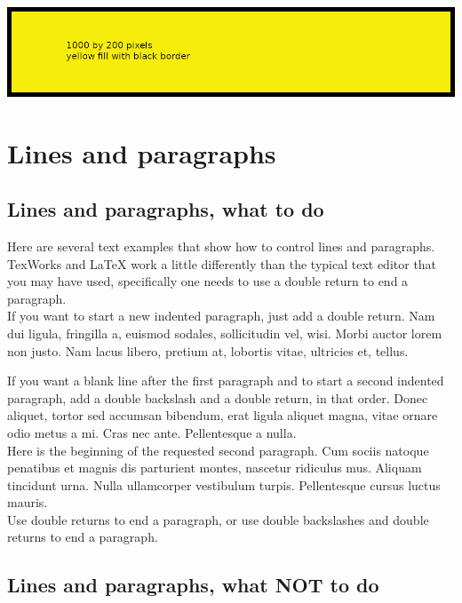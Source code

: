 \includegraphics{1000x200}

\newpage

\chapter{Lines and paragraphs}

\section{Lines and paragraphs, what to do}

Here are several text examples that show how to control lines and paragraphs.   TexWorks and LaTeX work a little differently than the typical text editor that you may have used, specifically one needs to use a double return to end a paragraph.\\

If you want to start a new indented paragraph, just add a double return. Nam dui ligula, fringilla a, euismod sodales, sollicitudin vel, wisi.  Morbi auctor lorem non justo. Nam lacus libero, pretium at, lobortis vitae, ultricies et, tellus.

If you want a blank line after the first paragraph and to start a second indented paragraph, add a double backslash and a double return, in that order.  Donec aliquet, tortor sed accumsan bibendum, erat ligula aliquet magna, vitae ornare odio metus a mi.  Cras nec ante. Pellentesque a nulla.\\

Here is the beginning of the requested second paragraph. Cum sociis natoque penatibus et magnis dis parturient montes, nascetur ridiculus mus. Aliquam tincidunt urna. Nulla ullamcorper vestibulum turpis. Pellentesque cursus luctus mauris.\\

Use double returns to end a paragraph, or use double backslashes and double returns to end a paragraph.

\section{Lines and paragraphs, what NOT to do}

